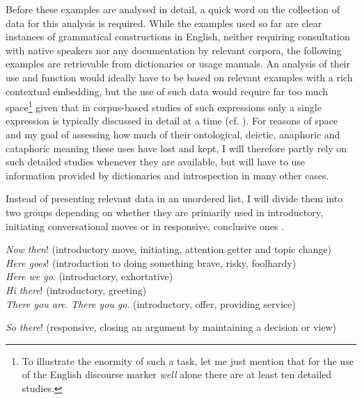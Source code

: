 \documentclass[output=paper,colorlinks,citecolor=brown]{langscibook}
\begin{document}
Before these examples are analysed in detail, a quick word on the collection of data for this analysis is required. While the examples used so far are clear instances of grammatical constructions in English, neither requiring consultation with native speakers nor any documentation by relevant corpora, the following examples are retrievable from dictionaries or usage manuals. An analysis of their use and function would ideally have to be based on relevant examples with a rich contextual embedding, but the use of such data would require far too much space\footnote{To illustrate the enormity of such a task, let me just mention that for the use of the English discourse marker \textit{well} alone there are at least ten detailed studies.} given that in corpus-based studies of such expressions only a single expression is typically discussed in detail at a time (cf. \citealt{GolatoBetz2008,BarskeGolato2010}). For reasons of space and my goal of assessing how much of their ontological, deictic, anaphoric and cataphoric meaning these uses have lost and kept, I will therefore partly rely on such detailed studies whenever they are available, but will have to use information provided by dictionaries and introspection in many other cases.

Instead of presenting relevant data in an unordered list, I will divide them into two groups depending on whether they are primarily used in introductory, initiating conversational moves  or in responsive, conclusive ones .

\ea\label{ex:koenig:11}
\ea \textit{Now then}! \newline (introductory move, initiating, attention getter and topic change) \\

\ex \textit{Here goes}! (introduction to doing something brave, risky, foolhardy)\\

\ex \textit{Here we go}. (introductory, exhortative)\\

\ex \textit{Hi there}! (introductory, greeting)\\

\ex \textit{There you are}. \textit{There you go}. (introductory, offer, providing service)\\
\z
\z

\ea\label{ex:koenig:12}
\ea \textit{So there}! \newline (responsive, closing an argument by maintaining a decision or view)\\
\end{document}
